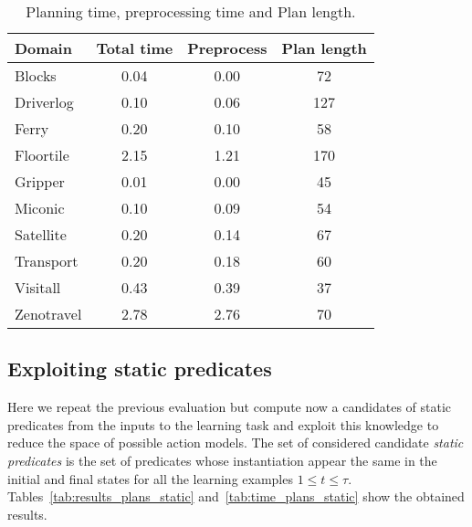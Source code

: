 \documentclass[letterpaper]{article} %
\begin{document}
\begin{table}[hbt!]
\begin{footnotesize}
	\begin{center}
		\begin{tabular}{l|c|c|c|}			
			Domain & Total time & Preprocess & Plan length  \\
			\hline
			Blocks & 0.04 & 0.00 & 72 \\
			Driverlog & 0.10 & 0.06 & 127 \\
			Ferry & 0.20 & 0.10 & 58 \\
			Floortile & 2.15 & 1.21 & 170 \\
			Gripper & 0.01 & 0.00 & 45 \\
			Miconic & 0.10 & 0.09 & 54 \\
			Satellite & 0.20 & 0.14 & 67 \\
			Transport & 0.20 & 0.18 & 60 \\
			Visitall & 0.43 & 0.39 & 37 \\
			Zenotravel & 2.78 & 2.76 & 70			
		\end{tabular}
	\end{center}
        \end{footnotesize}
	\caption{\small Planning time, preprocessing time and Plan length.}
	\label{tab:time_plans}	
\end{table}

\subsection{Exploiting static predicates}
Here we repeat the previous evaluation but compute now a candidates of static predicates from the inputs to the learning task and exploit this knowledge to reduce the space of possible action models. The set of considered candidate {\em static predicates} is the set of predicates whose instantiation appear the same in the initial and final states for all the learning examples {\small $1\leq t\leq \tau$}. Tables~\ref{tab:results_plans_static} and~\ref{tab:time_plans_static} show the obtained results.	
\end{document}
